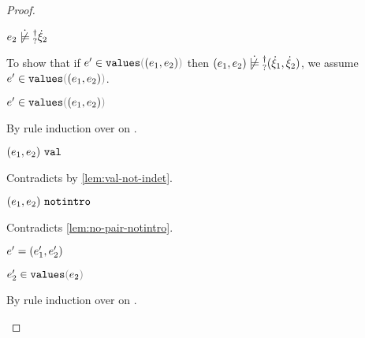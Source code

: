\begin{proof}
\begin{byCases}
\begin{byCases}
\begin{byCases}
\begin{byCases}
\begin{byCases}
\begin{byCases}
            \end{byCases}
          \end{byCases}
          \item[\cnotsatisfyormay{e_2}{\hxi_2}]
          \begin{pfsteps*}
          \item $\cnotsatisfyormay{e_2}{\hxi_2}$  
          \end{pfsteps*}
          To show that if $\inValues{e'}{\hpair{e_1}{e_2}}$ then $\cnotsatisfyormay{\hpair{e_1}{e_2}}{\cpair{\hxi_1}{\hxi_2}}$, we assume $\inValues{e'}{\hpair{e_1}{e_2}}$.
          \begin{pfsteps*}
          \item $\inValues{e'}{\hpair{e_1}{e_2}}$  
          \end{pfsteps*}
          By rule induction over  on .
          \begin{byCases}
            \item[\text{(\ref{rule:IVVal})}]
            \begin{pfsteps*}
            \item $(e_1 , e_2) ~\mathtt{val}$ 
            \end{pfsteps*} 
            Contradicts  by \autoref{lem:val-not-indet}.
            \item[\text{(\ref{rule:IVIndet})}] 
            \begin{pfsteps*}
            \item $(e_1 , e_2) ~\mathtt{notintro}$ 
            \end{pfsteps*}
            Contradicts \autoref{lem:no-pair-notintro}.
            \item[\text{(\ref{rule:IVPair})}]
            \begin{pfsteps*}
            \item $e'=(e_1' , e_2')$ 
            \item $\inValues{e_2'}{e_2}$  
            \end{pfsteps*}
            By rule induction over  on .
            \begin{byCases}

\end{byCases}
\end{byCases}
\end{byCases}
\end{byCases}
\end{byCases}
\end{byCases}
\end{proof}
